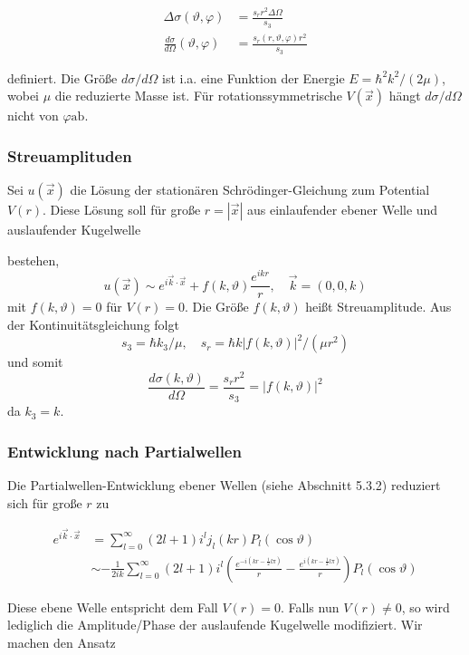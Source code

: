 \documentclass[10pt, letterpaper]{article}
\begin{document}
$$
\begin{aligned}
\Delta \sigma(\vartheta, \varphi) & =\frac{s_{r} r^{2} \Delta \Omega}{s_{3}} \\
\frac{d \sigma}{d \Omega}(\vartheta, \varphi) & =\frac{s_{r}(r, \vartheta, \varphi) r^{2}}{s_{3}}
\end{aligned}
$$

definiert. Die Größe $d \sigma / d \Omega$ ist i.a. eine Funktion der Energie $E=\hbar^{2} k^{2} /(2 \mu)$, wobei $\mu$ die reduzierte Masse ist. Für rotationssymmetrische $V(\vec{x})$ hängt $d \sigma / d \Omega$ nicht von $\varphi \mathrm{ab}$.

\subsubsection*{Streuamplituden}
Sei $u(\vec{x})$ die Lösung der stationären Schrödinger-Gleichung zum Potential $V(r)$. Diese Lösung soll für große $r=|\vec{x}|$ aus einlaufender ebener Welle und auslaufender Kugelwelle

bestehen,
$$
u(\vec{x}) \sim e^{i \vec{k} \cdot \vec{x}}+f(k, \vartheta) \frac{e^{i k r}}{r}, \quad \vec{k}=(0,0, k)
$$
mit $f(k, \vartheta)=0$ für $V(r)=0$. Die Größe $f(k, \vartheta)$ heißt Streuamplitude. Aus der Kontinuitätsgleichung folgt
$$
s_{3}=\hbar k_{3} / \mu, \quad s_{r}=\hbar k|f(k, \vartheta)|^{2} /\left(\mu r^{2}\right)
$$
und somit
$$
\frac{d \sigma(k, \vartheta)}{d \Omega}=\frac{s_{r} r^{2}}{s_{3}}=|f(k, \vartheta)|^{2}
$$
da $k_{3}=k$.

\subsubsection*{Entwicklung nach Partialwellen}
Die Partialwellen-Entwicklung ebener Wellen (siehe Abschnitt 5.3.2) reduziert sich für große $r$ zu

$$
\begin{aligned}
e^{i \vec{k} \cdot \vec{x}} & =\sum_{l=0}^{\infty}(2 l+1) i^{l} j_{l}(k r) P_{l}(\cos \vartheta) \\
& \sim-\frac{1}{2 i k} \sum_{l=0}^{\infty}(2 l+1) i^{l}\left(\frac{e^{-i\left(k r-\frac{1}{2} l \pi\right)}}{r}-\frac{e^{i\left(k r-\frac{1}{2} l \pi\right)}}{r}\right) P_{l}(\cos \vartheta)
\end{aligned}
$$

Diese ebene Welle entspricht dem Fall $V(r)=0$. Falls nun $V(r) \neq 0$, so wird lediglich die Amplitude/Phase der auslaufende Kugelwelle modifiziert. Wir machen den Ansatz
\end{document}
